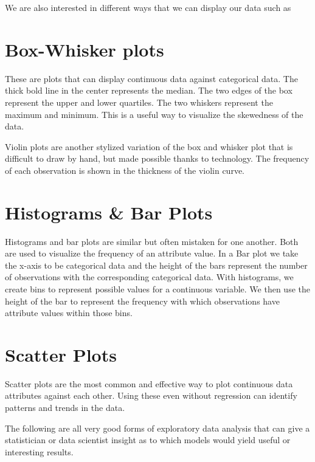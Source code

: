 We are also interested in different ways that we can display our data such as

\section{Box-Whisker plots}
These are plots that can display continuous data against categorical data. The thick bold line in the center represents the median. The two edges of the box represent the upper and lower quartiles. The two whiskers represent the maximum and minimum. This is a useful way to visualize the skewedness of the data.

Violin plots are another stylized variation of the box and whisker plot that is difficult to draw by hand, but made possible thanks to technology. The frequency of each observation is shown in the thickness of the violin curve.


\section{Histograms \& Bar Plots}
Histograms and bar plots are similar but often mistaken for one another. Both are used to visualize the frequency of an attribute value. In a Bar plot we take the x-axis to be categorical data and the height of the bars represent the number of observations with the corresponding categorical data. With histograms, we create bins to represent possible values for a continuous variable. We then use the height of the bar to represent the frequency with which observations have attribute values within those bins.

\section{Scatter Plots}
Scatter plots are the most common and effective way to plot continuous data attributes against each other. Using these even without regression can identify patterns and trends in the data.

The following are all very good forms of exploratory data analysis that can give a statistician or data scientist insight as to which models would yield useful or interesting results.